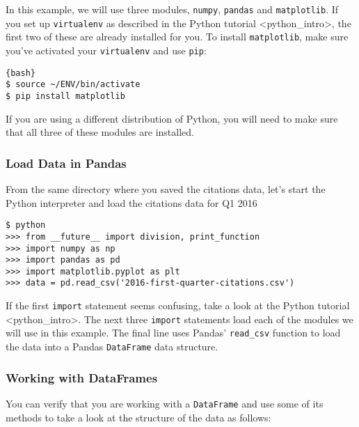 In this example, we will use three modules, \texttt{numpy},
\texttt{pandas} and \texttt{matplotlib}. If you set up
\texttt{virtualenv} as described in the
Python tutorial \textless{}python\_intro\textgreater{}, the first two of
these are already installed for you. To install \texttt{matplotlib},
make sure you've activated your \texttt{virtualenv} and use
\texttt{pip}:

\begin{lstlisting}{bash}
$ source ~/ENV/bin/activate
$ pip install matplotlib
\end{lstlisting}

If you are using a different distribution of Python, you will need to
make sure that all three of these modules are installed.

\subsubsection{Load Data in Pandas}\label{load-data-in-pandas}

From the same directory where you saved the citations data, let's start
the Python interpreter and load the citations data for Q1 2016

\begin{lstlisting}
$ python
>>> from __future__ import division, print_function
>>> import numpy as np
>>> import pandas as pd
>>> import matplotlib.pyplot as plt
>>> data = pd.read_csv('2016-first-quarter-citations.csv')
\end{lstlisting}

If the first \texttt{import} statement seems confusing, take a look at
the Python tutorial \textless{}python\_intro\textgreater{}. The next
three \texttt{import} statements load each of the modules we will use in
this example. The final line uses Pandas' \texttt{read\_csv} function to
load the data into a Pandas \texttt{DataFrame} data structure.

\subsubsection{Working with DataFrames}\label{working-with-dataframes}

You can verify that you are working with a \texttt{DataFrame} and use
some of its methods to take a look at the structure of the data as
follows:

